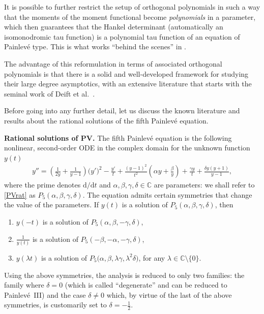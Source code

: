 \documentclass[pdftex]{sigma}
\numberwithin{equation}{section}
\theoremstyle{definition}
\def\le{\left}
\def\ri{\right}
\def \d{{\mathrm d}}
\def\C{{\mathbb C}}
\begin{document}
It is possible to further restrict the setup of orthogonal polynomials in such a way that the moments of the moment functional become {\it polynomials} in a parameter, which then guarantees that the Hankel determinant (automatically an isomonodromic tau function) is a polynomial tau function of an equation of Painlev\'e type. This is what works ``behind the scenes'' in \cite{BertolaBothner}.

The advantage of this reformulation in terms of associated orthogonal polynomials is that there is a solid and well-developed framework for studying their large degree asymptotics, with an extensive literature that starts with the seminal work of Deift et al.~\cite{DKMVZ}.

Before going into any further detail, let us discuss the known literature and results about the rational solutions of the fifth Painlev\'e equation.

{\bf Rational solutions of PV.}
The fifth Painlev\'e equation is the following nonlinear, second-order ODE in the complex domain for the unknown function $y(t)$
\begin{gather}
y'' = \le(\frac 1{2y} + \frac 1{y-1}\ri) \bigl(y'\bigr)^2 - \frac {y'}t + \frac {(y-1)^2}{t^2} \le(\alpha y + \frac \beta y\ri) + \frac {\gamma y}t + \frac {\delta y (y+1)}{y-1},
\label{PVrat}
\end{gather}
where the prime denotes $\d/{\d t}$ and $\alpha, \beta, \gamma, \delta \in \C$ are parameters: we shall refer to \eqref{PVrat} as $P_5(\alpha, \beta, \gamma,\delta)$.
The equation admits certain symmetries that change the value of the parameters. If $y(t)$ is a solution of $P_5(\alpha,\beta,\gamma,\delta)$, then
\begin{enumerate}\itemsep=0pt
\item[(1)] $y(-t)$ is a solution of $P_5(\alpha, \beta, - \gamma, \delta)$,
\item[(2)] $\frac 1{y(t)}$ is a solution of $P_5(-\beta,-\alpha, -\gamma, \delta)$,
\item[(3)] $y(\lambda t)$ is a solution of $P_5\bigl(\alpha, \beta, \lambda\gamma, \lambda^2 \delta\bigr)$, for any $\lambda\in \C\setminus\{0\}$.
\end{enumerate}
Using the above symmetries, the analysis is reduced to only two families: the family where $\delta=0$ (which is called ``degenerate'' and can be reduced to Painlev\'e~III) and the case $\delta\neq 0$ which, by virtue of the last of the above symmetries, is customarily set to $\delta = -\frac 1 2$.
\end{document}
